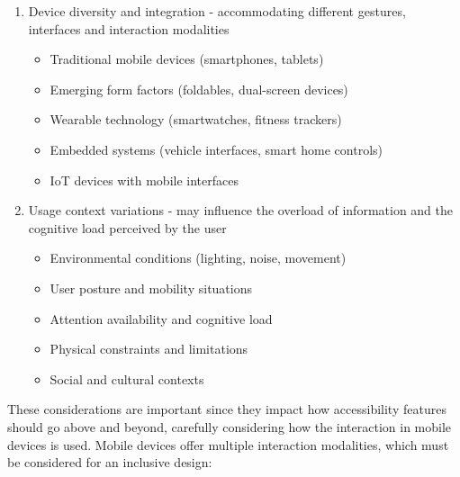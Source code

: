 \begin{enumerate}
    \item Device diversity and integration - accommodating different gestures, interfaces and interaction modalities
        \begin{itemize}
            \item Traditional mobile devices (smartphones, tablets)
            \item Emerging form factors (foldables, dual-screen devices)
            \item Wearable technology (smartwatches, fitness trackers)
            \item Embedded systems (vehicle interfaces, smart home controls)
            \item IoT devices with mobile interfaces
        \end{itemize}
    \item Usage context variations - may influence the overload of information and the cognitive load perceived by the user
        \begin{itemize}
            \item Environmental conditions (lighting, noise, movement)
            \item User posture and mobility situations
            \item Attention availability and cognitive load
            \item Physical constraints and limitations
            \item Social and cultural contexts
        \end{itemize}
\end{enumerate}

These considerations are important since they impact how accessibility features should go above and beyond, carefully considering how the interaction in mobile devices is used. Mobile devices offer multiple interaction modalities, which must be considered for an inclusive design:

